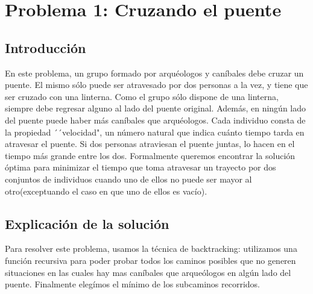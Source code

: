 \documentclass[spanish,12pt]{article}
\begin{document}
\author{Grupo  \\Alvarez Vico Jazm\'in\\Cortés Conde Titó Javier María\\Pedraza Marcelo \\ Rozenberg Uriel Jonathan}


\maketitle


\clearpage

\tableofcontents
\cleardoublepage

\section{Problema 1: Cruzando el puente}

\subsection{Introducción}

En este problema, un grupo formado por arquéologos y caníbales debe cruzar un puente. El mismo sólo puede ser atravesado por dos personas a la vez, y tiene que ser cruzado con una linterna. Como el grupo sólo dispone de una linterna, siempre debe regresar alguno al lado del puente original. Además, en ningún lado del puente puede haber más caníbales que arquéologos.
Cada individuo consta de la propiedad ´´velocidad", un número natural que indica cuánto tiempo tarda en atravesar el puente. Si dos personas atraviesan el puente juntas, lo hacen en el tiempo más grande entre los dos.
Formalmente queremos encontrar la solución óptima para minimizar el tiempo que toma atravesar un trayecto por dos conjuntos de individuos cuando uno de ellos no puede ser mayor al otro(exceptuando el caso en que uno de ellos es vacío).

\subsection{Explicación de la solución}
Para resolver este problema, usamos la técnica de backtracking: utilizamos una función recursiva para poder probar todos los caminos posibles que no generen situaciones en las cuales hay mas caníbales que arqueólogos en algún lado del puente. Finalmente elegímos el mínimo de los subcaminos recorridos.
\end{document}
